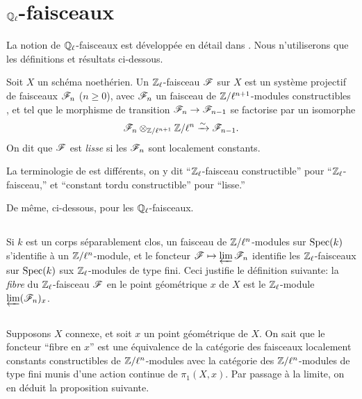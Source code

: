 \documentclass[oneside]{book}
\begin{document}
\section{\texorpdfstring{$\mathbb{Q}_\ell$}{Ql}-faisceaux}\label{II:2}

La notion de $\mathbb{Q}_\ell$-faisceaux est développée en détail dans 
\cite[V,VI]{SGA5}. Nous n'utiliserons que les définitions et résultats 
ci-dessous. 





\begin{definition_}\label{II:2-1}
Soit $X$ un schéma noethérien. Un $\mathbb{Z}_\ell$-faisceau $\mathscr{F}$ sur $X$ est un 
système projectif de faisceaux $\mathscr{F}_n$ ($n\geqslant 0$), avec $\mathscr{F}_n$ un 
faisceau de $\mathbb{Z}/\ell^{n+1}$-modules constructibles \cite[IX.2]{4}, et tel que 
le morphisme de transition $\mathscr{F}_n\to\mathscr{F}_{n-1}$ se factorise par un isomorphe 
\[
  \mathscr{F}_n\otimes_{\mathbb{Z}/\ell^{n+1}} \mathbb{Z}/\ell^n \xrightarrow\sim \mathscr{F}_{n-1}\text{.}
\]
On dit que $\mathscr{F}$ est \emph{lisse} si les $\mathscr{F}_n$ sont localement constants. 
\end{definition_}

La terminologie de \cite{SGA5} est différents, on y dit ``$\mathbb{Z}_\ell$-faisceau 
constructible'' pour ``$\mathbb{Z}_\ell$-faisceau,'' et ``constant tordu 
constructible'' pour ``lisse.'' 

De même, ci-dessous, pour les $\mathbb{Q}_\ell$-faisceaux. 





\subsection{}\label{II:2-2}

Si $k$ est un corps séparablement clos, un faisceau de $\mathbb{Z}/\ell^n$-modules 
sur $\operatorname{Spec}(k)$ s'identifie à un $\mathbb{Z}/\ell^n$-module, et le foncteur 
$\mathscr{F}\mapsto \varprojlim \mathscr{F}_n$ identifie les $\mathbb{Z}_\ell$-faisceaux sur 
$\operatorname{Spec}(k)$ sux $\mathbb{Z}_\ell$-modules de type fini. Ceci justifie le définition 
suivante: la \emph{fibre} du $\mathbb{Z}_\ell$-faisceau $\mathscr{F}$ en le point 
géométrique $x$ de $X$ est le $\mathbb{Z}_\ell$-module $\varprojlim (\mathscr{F}_n)_x$. 





\subsection{}\label{II:2-3}

Supposons $X$ connexe, et soit $x$ un point géométrique de $X$. On sait que 
le foncteur ``fibre en $x$'' est une équivalence de la catégorie des 
faisceaux localement constants constructibles de $\mathbb{Z}/\ell^n$-modules avec la 
catégorie des $\mathbb{Z}/\ell^n$-modules de type fini munis d'une action continue 
de $\pi_1(X,x)$. Par passage à la limite, on en déduit la proposition 
suivante. 
\end{document}
